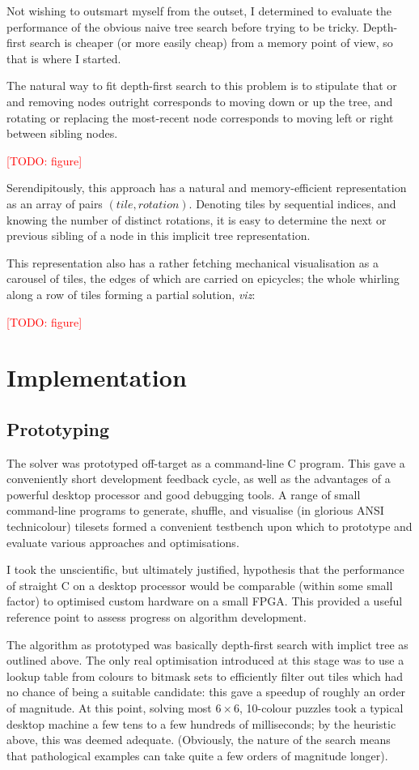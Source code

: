 \documentclass[a4paper,12pt]{article}
\newcommand{\todo}[1]{\textcolor{red}{[TODO: #1]}}
\begin{document}
Not wishing to outsmart myself from the outset, I determined to
evaluate the performance of the obvious naive tree search before
trying to be tricky. Depth-first search is cheaper (or more easily
cheap) from a memory point of view, so that is where I started.

The natural way to fit depth-first search to this problem is to
stipulate that or and removing nodes outright corresponds to moving
down or up the tree, and rotating or replacing the most-recent node
corresponds to moving left or right between sibling nodes.

\todo{figure}

Serendipitously, this approach has a natural and memory-efficient
representation as an array of pairs $(tile, rotation)$. Denoting tiles
by sequential indices, and knowing the number of distinct rotations,
it is easy to determine the next or previous sibling of a node in this
implicit tree representation.

This representation also has a rather fetching mechanical
visualisation as a carousel of tiles, the edges of which are carried
on epicycles; the whole whirling along a row of tiles forming a
partial solution, \textit{viz}:

\todo{figure}

\section{Implementation}

\subsection{Prototyping}

The solver was prototyped off-target as a command-line C program. This
gave a conveniently short development feedback cycle, as well as the
advantages of a powerful desktop processor and good debugging tools. A
range of small command-line programs to generate, shuffle, and
visualise (in glorious ANSI technicolour) tilesets formed a convenient
testbench upon which to prototype and evaluate various approaches and
optimisations.

I took the unscientific, but ultimately justified, hypothesis that the
performance of straight C on a desktop processor would be comparable
(within some small factor) to optimised custom hardware on a small
FPGA. This provided a useful reference point to assess progress on
algorithm development.

The algorithm as prototyped was basically depth-first search with
implict tree as outlined above. The only real optimisation introduced
at this stage was to use a lookup table from colours to bitmask sets
to efficiently filter out tiles which had no chance of being a
suitable candidate: this gave a speedup of roughly an order of
magnitude. At this point, solving most $6 \times 6$, 10-colour puzzles
took a typical desktop machine a few tens to a few hundreds of
milliseconds; by the heuristic above, this was deemed
adequate. (Obviously, the nature of the search means that pathological
examples can take quite a few orders of magnitude longer).
\end{document}
